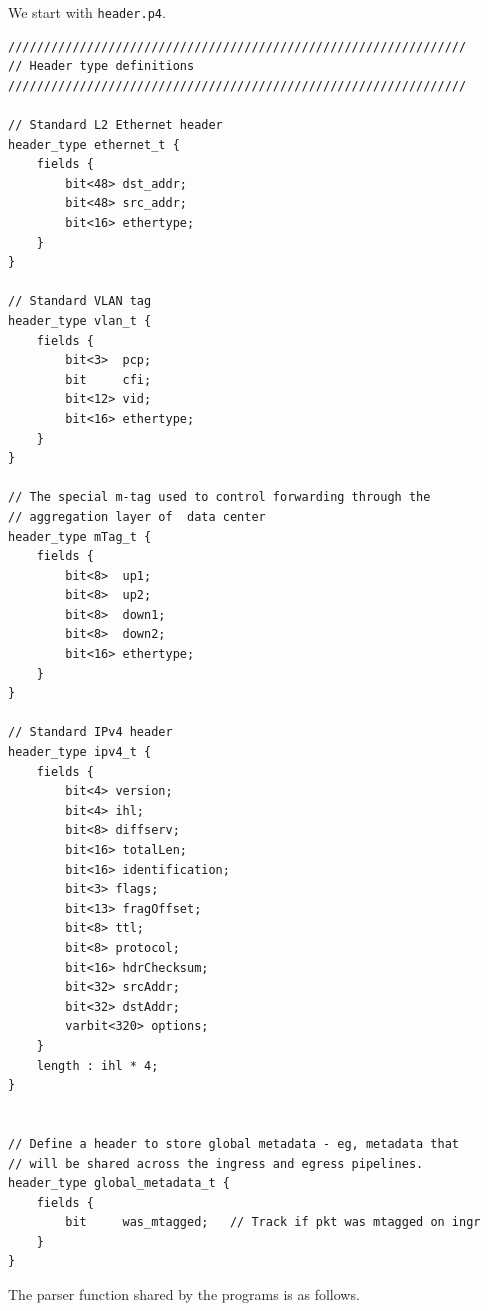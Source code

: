 \documentclass[12pt]{article}
\begin{document}
We start with \texttt{header.p4}. 


\begin{lstlisting}[style=P4style]
////////////////////////////////////////////////////////////////
// Header type definitions
////////////////////////////////////////////////////////////////

// Standard L2 Ethernet header
header_type ethernet_t {
    fields {
        bit<48> dst_addr;
        bit<48> src_addr;
        bit<16> ethertype;
    }
}

// Standard VLAN tag
header_type vlan_t {
    fields {
        bit<3>  pcp;
        bit     cfi;
        bit<12> vid;
        bit<16> ethertype;
    }
}

// The special m-tag used to control forwarding through the
// aggregation layer of  data center
header_type mTag_t {
    fields {
        bit<8>  up1;
        bit<8>  up2;
        bit<8>  down1;
        bit<8>  down2;
        bit<16> ethertype;
    }
}

// Standard IPv4 header
header_type ipv4_t {
    fields {
        bit<4> version;
        bit<4> ihl;
        bit<8> diffserv;
        bit<16> totalLen;
        bit<16> identification;
        bit<3> flags;
        bit<13> fragOffset;
        bit<8> ttl;
        bit<8> protocol;
        bit<16> hdrChecksum;
        bit<32> srcAddr;
        bit<32> dstAddr;
        varbit<320> options;
    }
    length : ihl * 4;
}


// Define a header to store global metadata - eg, metadata that
// will be shared across the ingress and egress pipelines.
header_type global_metadata_t {
    fields {
        bit     was_mtagged;   // Track if pkt was mtagged on ingr
    }
}
\end{lstlisting}

The parser function shared by the programs is as follows.
\end{document}
